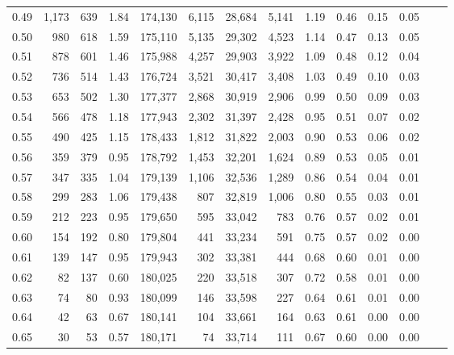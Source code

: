 \begin{tabular}{rrrrrrrrrrrrrr}
0.49 &  1,173 &    639 &    1.84 &  174,130 &    6,115 &  28,684 &   5,141 &  1.19 &  0.46 &  0.15 &      0.05 \\
0.50 &    980 &    618 &    1.59 &  175,110 &    5,135 &  29,302 &   4,523 &  1.14 &  0.47 &  0.13 &      0.05 \\
0.51 &    878 &    601 &    1.46 &  175,988 &    4,257 &  29,903 &   3,922 &  1.09 &  0.48 &  0.12 &      0.04 \\
0.52 &    736 &    514 &    1.43 &  176,724 &    3,521 &  30,417 &   3,408 &  1.03 &  0.49 &  0.10 &      0.03 \\
0.53 &    653 &    502 &    1.30 &  177,377 &    2,868 &  30,919 &   2,906 &  0.99 &  0.50 &  0.09 &      0.03 \\
0.54 &    566 &    478 &    1.18 &  177,943 &    2,302 &  31,397 &   2,428 &  0.95 &  0.51 &  0.07 &      0.02 \\
0.55 &    490 &    425 &    1.15 &  178,433 &    1,812 &  31,822 &   2,003 &  0.90 &  0.53 &  0.06 &      0.02 \\
0.56 &    359 &    379 &    0.95 &  178,792 &    1,453 &  32,201 &   1,624 &  0.89 &  0.53 &  0.05 &      0.01 \\
0.57 &    347 &    335 &    1.04 &  179,139 &    1,106 &  32,536 &   1,289 &  0.86 &  0.54 &  0.04 &      0.01 \\
0.58 &    299 &    283 &    1.06 &  179,438 &      807 &  32,819 &   1,006 &  0.80 &  0.55 &  0.03 &      0.01 \\
0.59 &    212 &    223 &    0.95 &  179,650 &      595 &  33,042 &     783 &  0.76 &  0.57 &  0.02 &      0.01 \\
0.60 &    154 &    192 &    0.80 &  179,804 &      441 &  33,234 &     591 &  0.75 &  0.57 &  0.02 &      0.00 \\
0.61 &    139 &    147 &    0.95 &  179,943 &      302 &  33,381 &     444 &  0.68 &  0.60 &  0.01 &      0.00 \\
0.62 &     82 &    137 &    0.60 &  180,025 &      220 &  33,518 &     307 &  0.72 &  0.58 &  0.01 &      0.00 \\
0.63 &     74 &     80 &    0.93 &  180,099 &      146 &  33,598 &     227 &  0.64 &  0.61 &  0.01 &      0.00 \\
0.64 &     42 &     63 &    0.67 &  180,141 &      104 &  33,661 &     164 &  0.63 &  0.61 &  0.00 &      0.00 \\
0.65 &     30 &     53 &    0.57 &  180,171 &       74 &  33,714 &     111 &  0.67 &  0.60 &  0.00 &      0.00 \\

\end{tabular}

